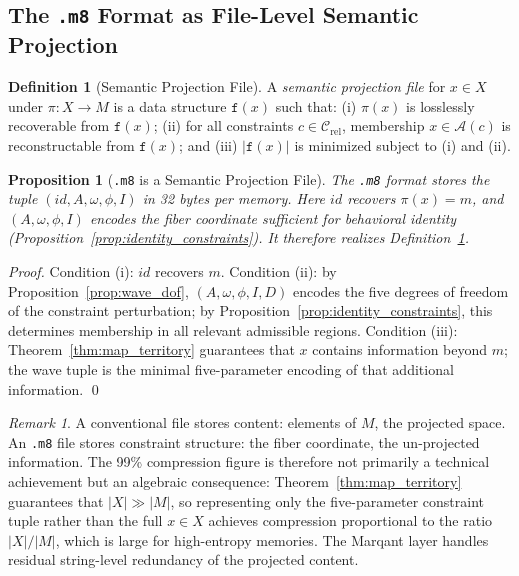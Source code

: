 \documentclass[12pt, a4paper, twoside]{article}
\theoremstyle{plain}
\newtheorem{proposition}[theorem]{Proposition}
\theoremstyle{definition}
\newtheorem{definition}[theorem]{Definition}
\theoremstyle{remark}
\newtheorem{remark}[theorem]{Remark}
\newcommand{\Acc}{\mathcal{A}}
\newcommand{\Proj}{\pi}
\begin{document}
\subsection{The \texttt{.m8} Format as File-Level Semantic Projection}

\begin{definition}[Semantic Projection File]
\label{def:semantic_file}
A \emph{semantic projection file} for $x \in X$ under $\Proj: X \to M$ is
a data structure $\mathtt{f}(x)$ such that: (i) $\Proj(x)$ is losslessly
recoverable from $\mathtt{f}(x)$; (ii) for all constraints $c \in
\mathcal{C}_{\mathrm{rel}}$, membership $x \in \Acc(c)$ is reconstructable
from $\mathtt{f}(x)$; and (iii) $|\mathtt{f}(x)|$ is minimized subject to
(i) and (ii).
\end{definition}

\begin{proposition}[\texttt{.m8} is a Semantic Projection File]
\label{prop:m8_semantic}
The \texttt{.m8} format stores the tuple $(id, A, \omega, \phi, I)$ in 32
bytes per memory. Here $id$ recovers $\Proj(x)=m$, and $(A,\omega,\phi,I)$
encodes the fiber coordinate sufficient for behavioral identity
(Proposition~\ref{prop:identity_constraints}). It therefore realizes
Definition~\ref{def:semantic_file}.
\end{proposition}

\begin{proof}
Condition (i): $id$ recovers $m$. Condition (ii): by
Proposition~\ref{prop:wave_dof}, $(A,\omega,\phi,I,D)$ encodes the five
degrees of freedom of the constraint perturbation; by
Proposition~\ref{prop:identity_constraints}, this determines membership in
all relevant admissible regions. Condition (iii): Theorem~\ref{thm:map_territory}
guarantees that $x$ contains information beyond $m$; the wave tuple is the
minimal five-parameter encoding of that additional information. \qed
\end{proof}

\begin{remark}
A conventional file stores content: elements of $M$, the projected space.
An \texttt{.m8} file stores constraint structure: the fiber coordinate, the
un-projected information. The 99\% compression figure is therefore not
primarily a technical achievement but an algebraic consequence:
Theorem~\ref{thm:map_territory} guarantees that $|X| \gg |M|$, so representing
only the five-parameter constraint tuple rather than the full $x \in X$ achieves
compression proportional to the ratio $|X|/|M|$, which is large for high-entropy
memories. The Marqant layer handles residual string-level redundancy of the
projected content.
\end{remark}
\end{document}
